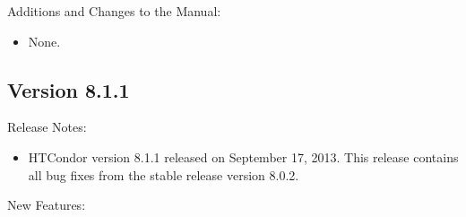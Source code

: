 \noindent Additions and Changes to the Manual:

\begin{itemize}

\item None.

\end{itemize}


\subsection*{\label{sec:New-8-1-1}Version 8.1.1}

\noindent Release Notes:

\begin{itemize}

\item HTCondor version 8.1.1 released on September 17, 2013.
This release contains all bug fixes from the stable release version 8.0.2.

\end{itemize}


\noindent New Features:

